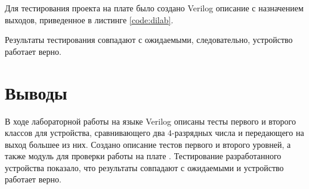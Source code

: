 Для тестирования проекта на плате было создано Verilog описание с назначением выходов, приведенное в листинге \ref{code:dilab}.


Результаты тестирования совпадают с ожидаемыми, следовательно, устройство работает верно.

\section{Выводы}

В ходе лабораторной работы на языке Verilog описаны тесты первого и второго классов для устройства, сравнивающего два $4$-разрядных числа и передающего на выход большее из них. Создано описание тестов первого и второго уровней, а также модуль для проверки работы на плате . Тестирование разработанного устройства показало, что результаты совпадают с ожидаемыми и устройство работает верно.

